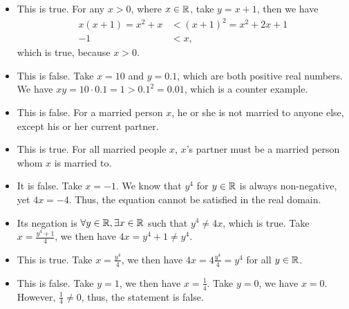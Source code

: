 \documentclass[8pt]{article}
\begin{document}
\begin{Answer}[number=2.3.11]
  \begin{itemize}
    \item This is true. For any $x>0$, where $x\in\mathbb{R}$, take $y=x+1$, then we
      have
      \begin{align*}
        x(x+1) = x^2 + x &< (x+1)^2 = x^2+2x+1 \\
        -1 &< x,
      \end{align*}
      which is true, because $x>0$.
    \item This is false. Take $x=10$ and $y=0.1$, which are both positive
      real numbers. We have $xy = 10\cdot 0.1 = 1 > 0.1^2 = 0.01$, which is a
      counter example.
  \end{itemize}
\end{Answer}

\begin{Answer}[number=2.3.12]
  \begin{itemize}
    \item This is false. For a married person $x$, he or she is not married to
      anyone else, except his or her current partner.
    \item This is true. For all married people $x$, $x$'s partner must be a
      married person whom $x$ is married to.
  \end{itemize}
\end{Answer}

\begin{Answer}[number=2.3.13]
  \begin{itemize}
    \item It is false. Take $x=-1$. We know that $y^4$ for $y\in \mathbb{R}$ is always non-negative,
      yet $4x = -4$. Thus, the equation cannot be satisfied in the real domain.
    \item Its negation is $\forall y\in\mathbb{R}, \exists x\in\mathbb{R}$ such that $y^4\ne
      4x$, which is true. Take $x= \frac{y^4+1}{4}$, we then have $4x=y^4+1\ne
      y^4$.
    \item This is true. Take $x=\frac{y^4}{4}$, we then have $4x=4\frac{y^4}{4}
      = y^4$ for all $y\in\mathbb{R}$.
    \item This is false. Take $y=1$, we then have $x=\frac{1}{4}$. Take $y=0$,
      we have $x=0$. However, $\frac{1}{4}\ne0$, thus, the statement is false.
  \end{itemize}
\end{Answer}
\end{document}
